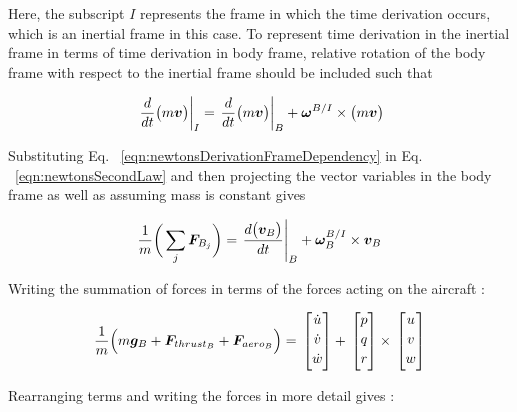 Here, the subscript $I$ represents the frame in which the time derivation occurs, which is an inertial frame in this case. 
To represent time derivation in the inertial frame in terms of time derivation in body frame, relative rotation of the body frame with respect to the inertial frame should be included such that


\begin{equation}{\label{eqn:newtonsDerivationFrameDependency}}
\left. \frac{d}{dt} \big( m \bm{v} \big) \right|_I = \left. \frac{d}{dt} \big( m \bm{v} \big) \right|_B + \bm{\omega}^{B/I} \times \big( m\bm{v} \big)
\end{equation}

Substituting Eq. ~\ref{eqn:newtonsDerivationFrameDependency} in Eq. ~\ref{eqn:newtonsSecondLaw} and then projecting the vector variables in the body frame as well as assuming mass is constant gives


 \begin{equation}{\label{eqn:newtonsSecondLaw2}}
\frac{1}{m} \bigg( \sum_j \bm{F}_{B_j} \bigg)= \left. \frac{d\big(\bm{v}_B \big)}{dt}  \right|_B + \bm{\omega}_B^{B/I} \times \bm{v}_B
\end{equation}

Writing the summation of forces in terms of the forces acting on the aircraft :

\begin{equation}{\label{eqn:dynamicsEquation1}}
\frac{1}{m} \Big( m \bm{g}_B + \bm{F}_{{thrust}_B} + \bm{F}_{{aero}_B} \Big)  =\,
\begin{bmatrix}
\dot{u}\\[0.2em]
\dot{v}\\[0.2em]
\dot{w}\\[0.2em]
\end{bmatrix}
+\,
\begin{bmatrix}
p\\[0.2em]
q\\[0.2em]
r\\[0.2em]
\end{bmatrix}
\times \,
\begin{bmatrix}
u\\[0.2em]
v\\[0.2em]
w\\[0.2em]
\end{bmatrix}
\end{equation}

Rearranging terms and writing the forces in more detail gives :

